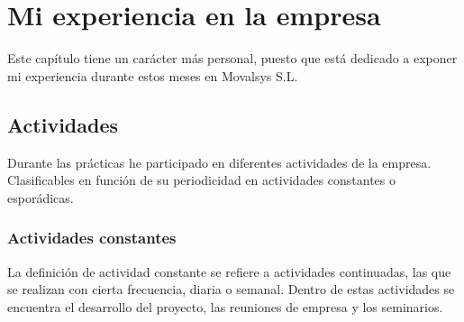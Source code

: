 \chapter{Mi experiencia en la empresa}

Este capítulo tiene un carácter más personal, puesto que está dedicado a exponer mi experiencia durante estos meses en Movalsys S.L. 

	\section{Actividades}
	
		Durante las prácticas he participado en diferentes actividades de la empresa. Clasificables en función de su periodicidad en actividades constantes o esporádicas.
		
		\subsection{Actividades constantes}
		
		La definición de actividad constante se refiere a actividades continuadas, las que se realizan con cierta frecuencia, diaria o semanal. Dentro de estas actividades se encuentra el desarrollo del proyecto, las reuniones de empresa y los seminarios.
		
